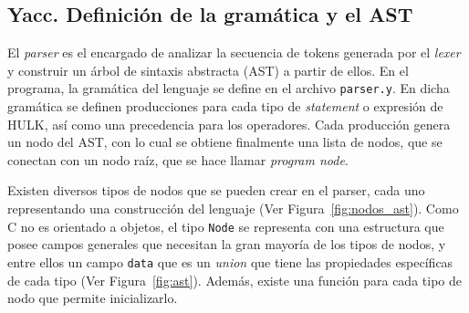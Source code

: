 \documentclass{llncs}
\begin{document}
\subsection{Yacc. Definición de la gramática y el AST}
El \textit{parser} es el encargado de analizar la secuencia de tokens generada por el \textit{lexer} y construir un árbol de sintaxis abstracta (AST) a partir de ellos. En el programa, la gramática del lenguaje se define en el archivo \texttt{parser.y}. 
En dicha gramática se definen producciones para cada tipo de \textit{statement} o expresión de HULK, así como una precedencia para los operadores. Cada producción genera un nodo del AST, con lo cual se obtiene finalmente una lista de nodos, que se conectan 
con un nodo raíz, que se hace llamar \textit{program node}.

Existen diversos tipos de nodos que se pueden crear en el parser, cada uno representando una construcción del lenguaje (Ver Figura~\ref{fig:nodos_ast}). Como C no es orientado a objetos, el tipo \texttt{Node} se representa con una estructura que posee campos generales 
que necesitan la gran mayoría de los tipos de nodos, y entre ellos un campo \texttt{data} que es un \textit{union} que tiene las propiedades específicas de cada tipo (Ver Figura~\ref{fig:ast}). Además, existe una función para cada tipo de nodo que permite inicializarlo.
\end{document}
